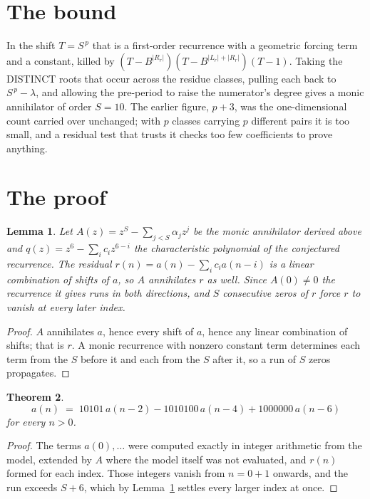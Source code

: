 \documentclass[11pt,a4paper]{article}
\theoremstyle{plain}
\newtheorem{theorem}{Theorem}
\newtheorem{lemma}[theorem]{Lemma}
\theoremstyle{definition}
\begin{document}
\section{The bound}

In the shift $T=S^{\,p}$ that is a first-order recurrence with a geometric forcing term and a
constant, killed by $(T-B^{|R_r|})(T-B^{|L_r|+|R_r|})(T-1)$. Taking the DISTINCT roots that
occur across the residue classes, pulling each back to $S^{\,p}-\lambda$, and allowing the
pre-period to raise the numerator's degree gives a monic annihilator of order $S=10$. The
earlier figure, $p+3$, was the one-dimensional count carried over unchanged; with $p$ classes
carrying $p$ different pairs it is too small, and a residual test that trusts it checks too few
coefficients to prove anything.

\section{The proof}

\begin{lemma}\label{lem:crit}
Let $A(z)=z^S-\sum_{j<S}\alpha_jz^{j}$ be the monic annihilator derived above and
$q(z)=z^{6}-\sum_ic_iz^{6-i}$ the characteristic polynomial of the conjectured
recurrence. The residual $r(n)=a(n)-\sum_ic_ia(n-i)$ is a linear combination of shifts of $a$,
so $A$ annihilates $r$ as well. Since $A(0)\ne0$ the recurrence it gives runs in both
directions, and $S$ consecutive zeros of $r$ force $r$ to vanish at every later index.
\end{lemma}

\begin{proof}
$A$ annihilates $a$, hence every shift of $a$, hence any linear combination of shifts; that is
$r$. A monic recurrence with nonzero constant term determines each term from the $S$ before it
and each from the $S$ after it, so a run of $S$ zeros propagates.
\end{proof}

\begin{theorem}
\[
a(n)\;=\;10101\,a(n-2) - 1010100\,a(n-4) + 1000000\,a(n-6)
\]
for every $n>0$.
\end{theorem}

\begin{proof}
The terms $a(0),\dots$ were computed exactly in integer arithmetic from the model, extended by
$A$ where the model itself was not evaluated, and $r(n)$ formed for each index. Those integers
vanish from $n=0+1$ onwards, and the run exceeds $S+6$, which by
Lemma~\ref{lem:crit} settles every larger index at once.
\end{proof}
\end{document}
